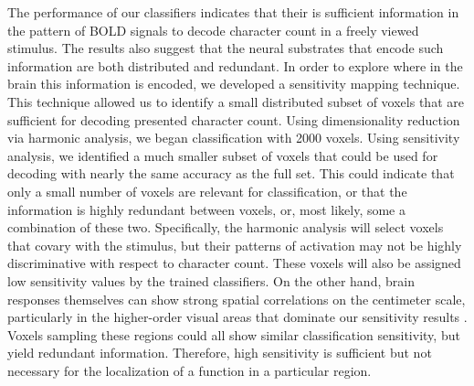 \documentclass[review,1p,authoryear]{elsarticle}
\begin{document}
The performance of our classifiers indicates that their is sufficient information in the pattern of BOLD signals to decode character count in a freely viewed stimulus. 
The results also suggest that the neural substrates that encode such information are both distributed and redundant.
In order to explore where in the brain this information is encoded, we developed a sensitivity mapping technique.
This technique allowed us to identify a small distributed subset of voxels that are sufficient for decoding presented character count.
Using dimensionality reduction via harmonic analysis, we began classification with 2000 voxels.
Using sensitivity analysis, we identified a much smaller subset of voxels that could be used for decoding with nearly the same accuracy as the full set.
This could indicate that only a small number of voxels are relevant for classification, or that the information is highly redundant between voxels, or, most likely, some a combination of these two.
Specifically, the harmonic analysis will select voxels that covary with the stimulus, but their patterns of activation may not be highly discriminative with respect to character count.
These voxels will also be assigned low sensitivity values by the trained classifiers.
On the other hand, brain responses themselves can show strong spatial correlations on the centimeter scale, particularly in the higher-order visual areas that dominate our sensitivity results \citep{Engel1997}. 
Voxels sampling these regions could all show similar classification sensitivity, but yield redundant information.
Therefore, high sensitivity is sufficient but not necessary for the localization of a function in a particular region.
\end{document}
